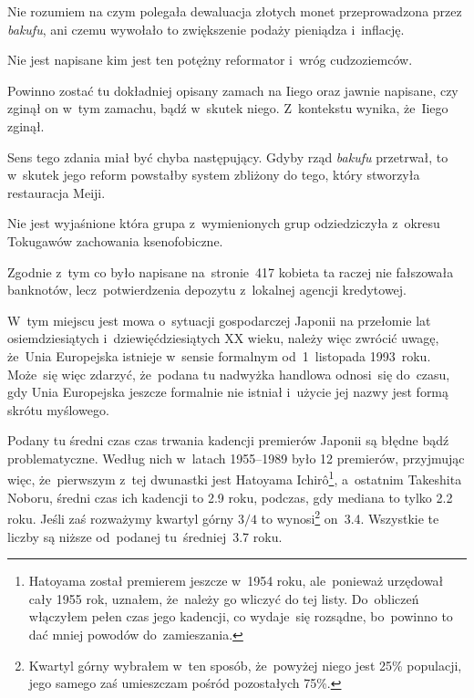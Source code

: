 \documentclass[a4paper,11pt]{article}
\begin{document}
\start {} Nie rozumiem na czym polegała dewaluacja złotych monet
przeprowadzona przez \emph{bakufu}, ani czemu wywołało to zwiększenie
podaży pieniądza i~inflację.

\vspace{\spaceFour}


\start {} Nie jest napisane kim jest ten potężny
reformator i~wróg cudzoziemców.

\vspace{\spaceFour}


\start {} Powinno zostać tu dokładniej opisany zamach na Iiego
oraz jawnie napisane, czy zginął on w~tym zamachu, bądź w~skutek
niego. Z~kontekstu wynika, że~Iiego zginął.

\vspace{\spaceFour}


\start {} Sens tego zdania miał być chyba następujący. Gdyby
rząd \emph{bakufu} przetrwał, to w~skutek jego reform powstałby system
zbliżony do tego, który stworzyła restauracja Meiji.

\vspace{\spaceFour}


\start {} Nie jest wyjaśnione która grupa
z~wymienionych grup odziedziczyła z~okresu Tokugawów zachowania
ksenofobiczne.

\vspace{\spaceFour}


\start {} Zgodnie z~tym co było napisane na~stronie~417
kobieta ta raczej nie fałszowała banknotów, lecz~potwierdzenia
depozytu z~lokalnej agencji kredytowej.

\vspace{\spaceFour}


\start {} W~tym miejscu jest mowa o~sytuacji gospodarczej
Japonii na przełomie lat osiemdziesiątych i~dziewięćdziesiątych XX
wieku, należy więc zwrócić uwagę, że~Unia Europejska istnieje w~sensie
formalnym od~1~listopada 1993~roku. Może~się więc zdarzyć, że~podana
tu nadwyżka handlowa odnosi~się do~czasu, gdy Unia Europejska jeszcze
formalnie nie istniał i~użycie jej nazwy jest formą skrótu myślowego.

\vspace{\spaceFour}


\start {} Podany tu średni czas czas trwania kadencji premierów
Japonii są błędne bądź problematyczne. Według nich w~latach 1955--1989
było 12 premierów, przyjmując więc, że~pierwszym z~tej dwunastki jest
Hatoyama Ichir\^{o}\footnote{Hatoyama został premierem jeszcze w~1954
  roku, ale~ponieważ urzędował cały 1955 rok, uznałem, że~należy go
  wliczyć do tej listy. Do~obliczeń włączyłem pełen czas jego
  kadencji, co wydaje~się rozsądne, bo~powinno to dać mniej powodów
  do~zamieszania.}, a~ostatnim Takeshita Noboru, średni czas ich
kadencji to 2.9 roku, podczas, gdy mediana to tylko 2.2 roku. Jeśli
zaś rozważymy kwartyl górny $3/4$ to wynosi\footnote{Kwartyl górny
  wybrałem w~ten sposób, że~powyżej niego jest 25\% populacji, jego
  samego zaś umieszczam pośród pozostałych 75\%.} on~3.4. Wszystkie te
liczby są niższe od~podanej tu~średniej~3.7 roku.
\end{document}
